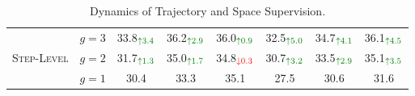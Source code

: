 \begin{table}[t]
\begin{minipage}[t]{0.701\linewidth}
{\begin{tabular}{l c | c c c | c c c}
                \multirow{3}{*}{\textsc{Step-Level}} & $g=3$ & 33.8$_{\textcolor{darkgreen}{\uparrow 3.4}}$ & 36.2$_{\textcolor{darkgreen}{\uparrow 2.9}}$ & 36.0$_{\textcolor{darkgreen}{\uparrow 0.9}}$ & 32.5$_{\textcolor{darkgreen}{\uparrow 5.0}}$ & 34.7$_{\textcolor{darkgreen}{\uparrow 4.1}}$ & 36.1$_{\textcolor{darkgreen}{\uparrow 4.5}}$ \\
                 
                 & $g=2$ & 31.7$_{\textcolor{darkgreen}{\uparrow 1.3}}$ & 35.0$_{\textcolor{darkgreen}{\uparrow 1.7}}$ & 34.8$_{\textcolor{red}{\downarrow 0.3}}$ & 30.7$_{\textcolor{darkgreen}{\uparrow 3.2}}$ & 33.5$_{\textcolor{darkgreen}{\uparrow 2.9}}$ & 35.1$_{\textcolor{darkgreen}{\uparrow 3.5}}$ \\
                 
                 & $g=1$ & 30.4 & 33.3 & 35.1 & 27.5 & 30.6 & 31.6 \\
                \bottomrule
            \end{tabular}
        }
    \end{minipage}
    
    \begin{minipage}[t]{1.0\linewidth}
    \centering
    \caption{Dynamics of Trajectory and Space Supervision.}
    \label{tab:part2}
    {\scriptsize
    }
\end{minipage}
\end{table}
